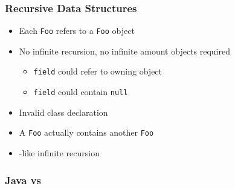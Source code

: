 \begin{frame}
  \frametitle{Recursive Data Structures}
  \begin{itemize}
    \item Each \texttt{Foo} refers to a \texttt{Foo} object
    \item No infinite recursion, no infinite amount objects required
          \begin{itemize}
            \item \texttt{field} could refer to owning object
            \item \texttt{field} could contain \texttt{null}
          \end{itemize}
  \end{itemize}
  \structure{\cpp}
  \begin{itemize}
    \item Invalid class declaration
    \item A \texttt{Foo} actually contains another \texttt{Foo}
    \item {}-like infinite recursion
  \end{itemize}
\end{frame}

\begin{frame}
  \frametitle{Java vs \cpp}
  \vskip4mm
\end{frame}

